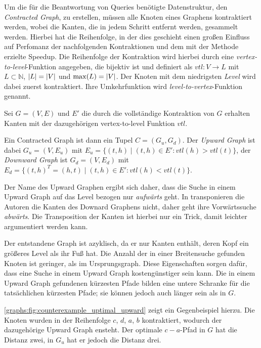 Um die für die Beantwortung von Queries benötigte Datenstruktur, den \emph{Contracted Graph}, zu erstellen, müssen alle Knoten eines Graphens kontraktiert werden, wobei die Kanten, die in jedem Schritt entfernt werden, gesammelt werden.
Hierbei hat die Reihenfolge, in der dies geschieht einen großen Einfluss auf Perfomanz der nachfolgenden Kontraktionen und dem mit der Methode erzielte Speedup.
Die Reihenfolge der Kontraktion wird hierbei durch eine \emph{vertex-to-level}-Funktion angegeben, die bijektiv ist und definiert als ${vtl} \colon V \to L$ mit $L \subset \mathbb{N}$, $\abs{L} = \abs{V}$ und $\max(L) = \abs{V}$.
Der Knoten mit dem niedrigsten \emph{Level} wird dabei zuerst kontraktiert.
Ihre Umkehrfunktion wird \emph{level-to-vertex}-Funktion genannt.

\begin{definition}
    Sei $G = (V, E)$ und $E'$ die durch die vollständige Kontraktion von $G$ erhalten Kanten mit der dazugehörigen vertex-to-level Funktion ${vtl}$.

    Ein Contracted Graph ist dann ein Tupel $C = (G_u, G_d)$. Der \emph{Upward Graph} ist dabei $G_u = (V, E_u)$ mit $E_u = \{ (t, h) \mid (t, h) \in E' \colon {vtl}(h) > {vtl}(t) \}$, der \emph{Downward Graph} ist $G_d = (V, E_d)$ mit $E_d = \{ (t, h)^T = (h, t) \mid (t, h) \in E' \colon {vtl}(h) < {vtl}(t) \}$.
\end{definition}

Der Name des Upward Graphen ergibt sich daher, dass die Suche in einem Upward Graph auf das Level bezogen nur \emph{aufwärts} geht.
In \cite{geisberger2008contraction} transponieren die Autoren die Kanten des Downard Graphens nicht, daher geht ihre Vorwärtssuche \emph{abwärts}.
Die Transposition der Kanten ist hierbei nur ein Trick, damit leichter argumentiert werden kann.

Der entstandene Graph ist azyklisch, da er nur Kanten enthält, deren Kopf ein größeres Level als ihr Fuß hat.
Die Anzahl der in einer Breitensuche gefunden Knoten ist geringer, als im Ursprungsgraph.
Diese Eigenschaften sorgen dafür, dass eine Suche in einem Upward Graph kostengünstiger sein kann.
Die in einem Upward Graph gefundenen kürzesten Pfade bilden eine untere Schranke für die tatsächlichen kürzesten Pfade; sie können jedoch auch länger sein als in $G$.

\autoref{graphs:fig:counterexample_uptimal_upward} zeigt ein Gegenbeispiel hierzu.
Die Knoten wurden in der Reihenfolge $c$, $d$, $a$, $b$ kontraktiert, wodurch der dazugehörige Upward Graph ensteht.
Der optimale $c-a$-Pfad in $G$ hat die Distanz zwei, in $G_u$ hat er jedoch die Distanz drei.

